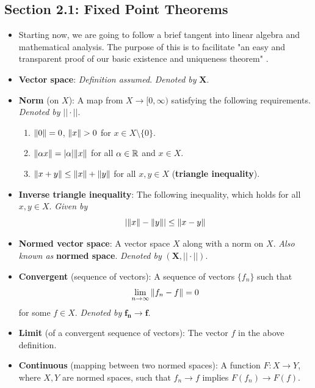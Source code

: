 \documentclass[../notes.tex]{subfiles}
\begin{document}
\subsection*{Section 2.1: Fixed Point Theorems}
\begin{itemize}
    \item Starting now, we are going to follow a brief tangent into linear algebra and mathematical analysis. The purpose of this is to facilitate "an easy and transparent proof of our basic existence and uniqueness theorem" \parencite[35]{bib:Teschl}.
    \item \textbf{Vector space}: \emph{Definition assumed}. \emph{Denoted by} $\bm{X}$.
    \item \textbf{Norm} (on $X$): A map from $X\to[0,\infty)$ satisfying the following requirements. \emph{Denoted by} $\bm{||\cdot||}$.
    \begin{enumerate}
        \item $\norm{0}=0$, $\norm{x}>0$ for $x\in X\setminus\{0\}$.
        \item $\norm{\alpha x}=|\alpha|\norm{x}$ for all $\alpha\in\mathbb{R}$ and $x\in X$.
        \item $\norm{x+y}\leq\norm{x}+\norm{y}$ for all $x,y\in X$ (\textbf{triangle inequality}).
    \end{enumerate}
    \item \textbf{Inverse triangle inequality}: The following inequality, which holds for all $x,y\in X$. \emph{Given by}
    \begin{equation*}
        |\norm{x}-\norm{y}| \leq \norm{x-y}
    \end{equation*}
    \item \textbf{Normed vector space}: A vector space $X$ along with a norm on $X$. \emph{Also known as} \textbf{normed space}. \emph{Denoted by} $\bm{(X,||\cdot||)}$.
    \item \textbf{Convergent} (sequence of vectors): A sequence of vectors $\{f_n\}$ such that
    \begin{equation*}
        \lim_{n\to\infty}\norm{f_n-f} = 0
    \end{equation*}
    for some $f\in X$. \emph{Denoted by} $\bm{f_n\to f}$.
    \item \textbf{Limit} (of a convergent sequence of vectors): The vector $f$ in the above definition.
    \item \textbf{Continuous} (mapping between two normed spaces): A function $F:X\to Y$, where $X,Y$ are normed spaces, such that $f_n\to f$ implies $F(f_n)\to F(f)$.

\end{itemize}
\end{document}
